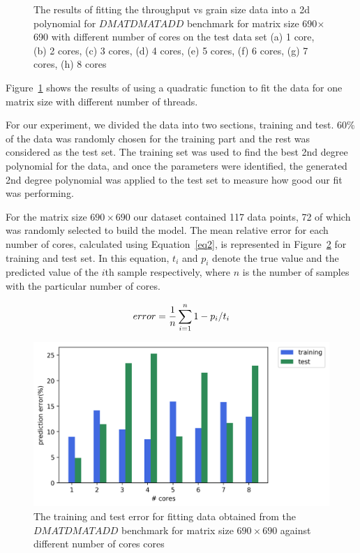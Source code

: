 \begin{figure}[H]
	\caption{The results of fitting the throughput vs grain size data into a 2d polynomial for $DMATDMATADD$ benchmark for matrix size 690$\times$690 with different number of cores on the test data set (a) 1 core, (b) 2 cores, (c) 3 cores, (d) 4 cores, (e) 5 cores, (f) 6 cores, (g) 7 cores, (h) 8 cores}	
	\label{fig10}
\end{figure}


\vspace{\baselineskip}	
Figure~\ref{fig10} shows the results of using a quadratic function to fit the data for one matrix size with different number of threads. 

For our experiment, we divided the data into two sections, training and test. $60\%$ of the data was randomly chosen for the training part and the rest was considered as the test set. The training set was used to find the best 2nd degree polynomial for the data, and once the parameters were identified, the generated 2nd degree polynomial was applied to the test set to measure how good our fit was performing. 

For the matrix size $690\times690$ our dataset contained 117 data points, 72 of which was randomly selected to build the model. The mean relative error for each number of cores, calculated using Equation~\ref{eq2}, is represented in Figure~\ref{fig11} for training and test set. In this equation, $t_i$ and $p_i$ denote the true value and the predicted value of the $i$th sample respectively, where $n$ is the number of samples with the particular number of cores. 

\begin{equation}{\label{eq2}}
error = \frac{1}{n}\sum_{i=1}^{n} {1-p_i/t_i}
\end{equation}

\vspace{\baselineskip}	
\begin{figure}[H]
	\centering
	\includegraphics[scale=.75]{images/polyfit/fig_train_test_690.png}
	\caption{The training and test error for fitting data obtained from the $DMATDMATADD$ benchmark for matrix size $690\times690$ against different number of cores cores}	
	\label{fig11}
\end{figure}

